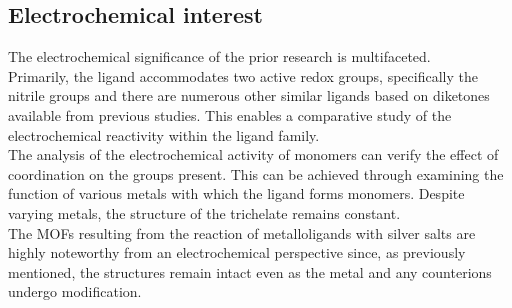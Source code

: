 \documentclass[../Master.tex]{subfiles}
\begin{document}
\subsection{Electrochemical interest}

The electrochemical significance of the prior research is multifaceted.\\
Primarily, the ligand accommodates two active redox groups, specifically the nitrile groups and there are numerous other similar ligands based on diketones available from previous studies. This enables a comparative study of the electrochemical reactivity within the ligand family.\\
The analysis of the electrochemical activity of monomers can verify the effect of coordination on the groups present. This can be achieved through examining the function of various metals with which the ligand forms monomers. Despite varying metals, the structure of the trichelate remains constant.\\
The MOFs resulting from the reaction of metalloligands with silver salts are highly noteworthy from an electrochemical perspective since, as previously mentioned, the structures  remain intact even as the metal and any counterions undergo modification.

\end{document}
